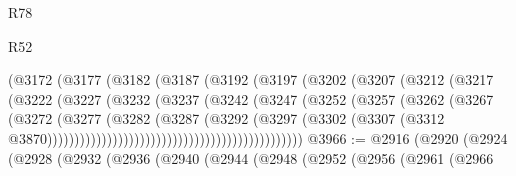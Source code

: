 \begin{lexlean}{R78}
\begin{lexlean}{R52}
\begin{coremodule}
{{{{{{{{{{{{{{{{{{{{{{{{{{{{{{{{{{{{{{{{{{{{{{{{{{{{{{{{{{{{{{{{{{{{{{{{{{{{{{{{{{{{{{{{{{{{{{{{{{{{{{{{{{{{{{{{{{{{{{{{{{{{{{{{{{{{{{{{{{{{{{{{{{{{{{{{{{{{{{{{{{{{{{{{{{{{{{{{{{{{{{{{{{{{{{{{{{{{{{                                        (@3172
                                          (@3177
                                            (@3182
                                              (@3187
                                                (@3192
                                                  (@3197
                                                    (@3202
                                                      (@3207
                                                        (@3212
                                                          (@3217
                                                            (@3222
                                                              (@3227
                                                                (@3232
                                                                  (@3237
                                                                    (@3242
                                                                      (@3247
                                                                        (@3252
                                                                          (@3257
                                                                            (@3262
                                                                              (@3267
                                                                                (@3272
                                                                                  (@3277
                                                                                    (@3282
                                                                                      (@3287
                                                                                        (@3292
                                                                                          (@3297
                                                                                            (@3302
                                                                                              (@3307
                                                                                                (@3312
                                                                                                  @3870)))))))))))))))))))))))))))))))))))))))))))))))
@3966 := @2916
    (@2920
      (@2924
        (@2928
          (@2932
            (@2936
              (@2940
                (@2944
                  (@2948
                    (@2952
                      (@2956
                        (@2961
                          (@2966
}}}}}}}}}}}}}}}}}}}}}}}}}}}}}}}}}}}}}}}}}}}}}}}}}}}}}}}}}}}}}}}}}}}}}}}}}}}}}}}}}}}}}}}}}}}}}}}}}}}}}}}}}}}}}}}}}}}}}}}}}}}}}}}}}}}}}}}}}}}}}}}}}}}}}}}}}}}}}}}}}}}}}}}}}}}}}}}}}}}}}}}}}}}}}}}}}}}}}}
\end{coremodule}
\end{lexlean}
\end{lexlean}
